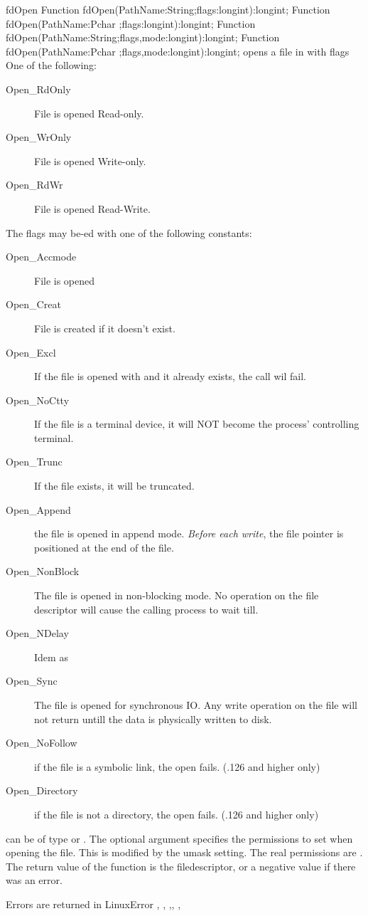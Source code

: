 \begin{function}{fdOpen}
\Declaration
Function fdOpen(PathName:String;flags:longint):longint;
Function fdOpen(PathName:Pchar ;flags:longint):longint;
Function fdOpen(PathName:String;flags,mode:longint):longint; 
Function fdOpen(PathName:Pchar ;flags,mode:longint):longint;
\Description
{} opens a file in  with flags  
One of the following:
\begin{description}
\item [Open\_RdOnly] File is opened Read-only.
\item [Open\_WrOnly] File is opened Write-only.
\item [Open\_RdWr] File is opened Read-Write.
\end{description}
The flags may be-ed with one of the following constants:
\begin{description}
\item [Open\_Accmode] File is opened
\item [Open\_Creat] File is created if it doesn't exist.
\item [Open\_Excl] If the file is opened with  and it 
already exists, the call wil fail.
\item [Open\_NoCtty] If the file is a terminal device, it will NOT become
the process' controlling terminal.
\item [Open\_Trunc] If the file exists, it will be truncated.
\item [Open\_Append] the file is opened in append mode. {\em Before each
write}, the file pointer is positioned at the end of the file.
\item [Open\_NonBlock] The file is opened in non-blocking mode. No operation
on the file descriptor will cause the calling process to wait till.
\item [Open\_NDelay] Idem as 
\item [Open\_Sync] The file is opened for synchronous IO. Any write
operation on the file will not return untill the data is physically written
to disk.
\item [Open\_NoFollow] if the file is a symbolic link, the open fails.
(.126 and higher only)
\item [Open\_Directory] if the file is not a directory, the open fails.
(.126 and higher only)
\end{description}
 can be of type  or .
The optional  argument specifies the permissions to set when opening
the file. This is modified by the umask setting. The real permissions are
.
The return value of the function is the filedescriptor, or a negative 
value if there was an error.

\Errors
Errors are returned in LinuxError
\SeeAlso
{}, , ,,
, 
\end{function}

